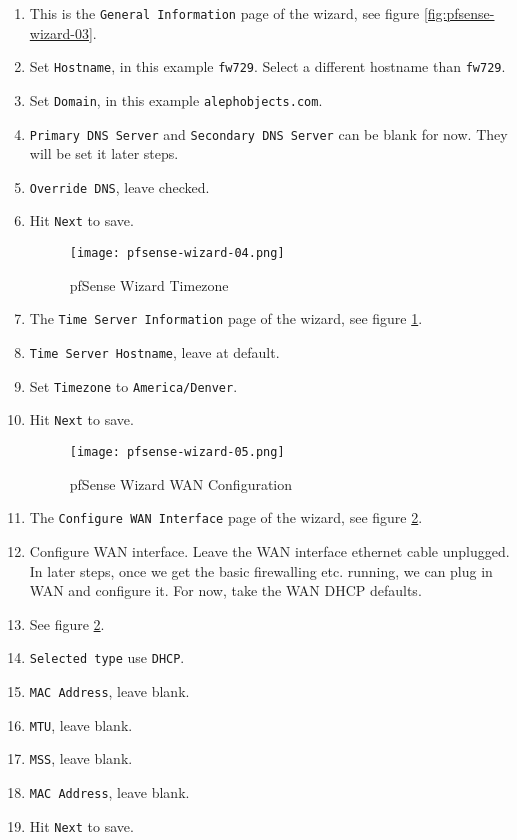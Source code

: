 \begin{enumerate}
 \item This is the \texttt{General Information} page of the wizard, see figure \ref{fig:pfsense-wizard-03}.
 \item Set \texttt{Hostname}, in this example \texttt{fw729}. Select a different hostname than \texttt{fw729}.
 \item Set \texttt{Domain}, in this example \texttt{alephobjects.com}.
 \item \texttt{Primary DNS Server} and \texttt{Secondary DNS Server} can be blank for now. They will be set it later steps.
 \item \texttt{Override DNS}, leave checked.
 \item Hit \texttt{Next} to save.

\begin{figure}[h!]
\begin{center}
\texttt{[image: pfsense-wizard-04.png]}
 \caption{pfSense Wizard Timezone}
 \label{fig:pfsense-wizard-04}
\end{center}
\end{figure}

 \item The \texttt{Time Server Information} page of the wizard, see figure \ref{fig:pfsense-wizard-04}.
 \item \texttt{Time Server Hostname}, leave at default.
 \item Set \texttt{Timezone} to \texttt{America/Denver}.
 \item Hit \texttt{Next} to save.

\begin{figure}[h!]
\begin{center}
\texttt{[image: pfsense-wizard-05.png]}
 \caption{pfSense Wizard WAN Configuration}
 \label{fig:pfsense-wizard-05}
\end{center}
\end{figure}

 \item The \texttt{Configure WAN Interface} page of the wizard, see figure \ref{fig:pfsense-wizard-05}.
 \item Configure WAN interface. Leave the WAN interface ethernet cable unplugged. In later steps, once we get the basic firewalling etc. running, we can plug in WAN and configure it. For now, take the WAN DHCP defaults.
 \item See figure \ref{fig:pfsense-wizard-05}.
 \item \texttt{Selected type} use \texttt{DHCP}.
 \item \texttt{MAC Address}, leave blank.
 \item \texttt{MTU}, leave blank.
 \item \texttt{MSS}, leave blank.
 \item \texttt{MAC Address}, leave blank.
 \item Hit \texttt{Next} to save.


\end{enumerate}
